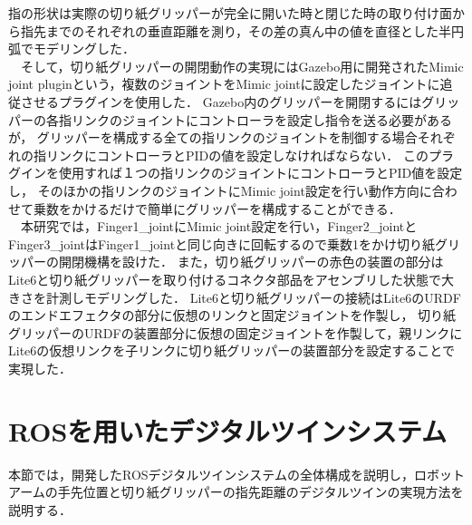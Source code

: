 指の形状は実際の切り紙グリッパーが完全に開いた時と閉じた時の取り付け面から指先までのそれぞれの垂直距離を測り，その差の真ん中の値を直径とした半円弧でモデリングした．\\
　そして，切り紙グリッパーの開閉動作の実現にはGazebo用に開発されたMimic joint pluginという，複数のジョイントをMimic jointに設定したジョイントに追従させるプラグインを使用した．
Gazebo内のグリッパーを開閉するにはグリッパーの各指リンクのジョイントにコントローラを設定し指令を送る必要があるが，
グリッパーを構成する全ての指リンクのジョイントを制御する場合それぞれの指リンクにコントローラとPIDの値を設定しなければならない．
このプラグインを使用すれば１つの指リンクのジョイントにコントローラとPID値を設定し，
そのほかの指リンクのジョイントにMimic joint設定を行い動作方向に合わせて乗数をかけるだけで簡単にグリッパーを構成することができる．\\
　本研究では，Finger1\_jointにMimic joint設定を行い，Finger2\_jointとFinger3\_jointはFinger1\_jointと同じ向きに回転するので乗数1をかけ切り紙グリッパーの開閉機構を設けた．
また，切り紙グリッパーの赤色の装置の部分はLite6と切り紙グリッパーを取り付けるコネクタ部品をアセンブリした状態で大きさを計測しモデリングした．
Lite6と切り紙グリッパーの接続はLite6のURDFのエンドエフェクタの部分に仮想のリンクと固定ジョイントを作製し，
切り紙グリッパーのURDFの装置部分に仮想の固定ジョイントを作製して，親リンクにLite6の仮想リンクを子リンクに切り紙グリッパーの装置部分を設定することで実現した．


\section{ROSを用いたデジタルツインシステム}
本節では，開発したROSデジタルツインシステムの全体構成を説明し，ロボットアームの手先位置と切り紙グリッパーの指先距離のデジタルツインの実現方法を説明する．

